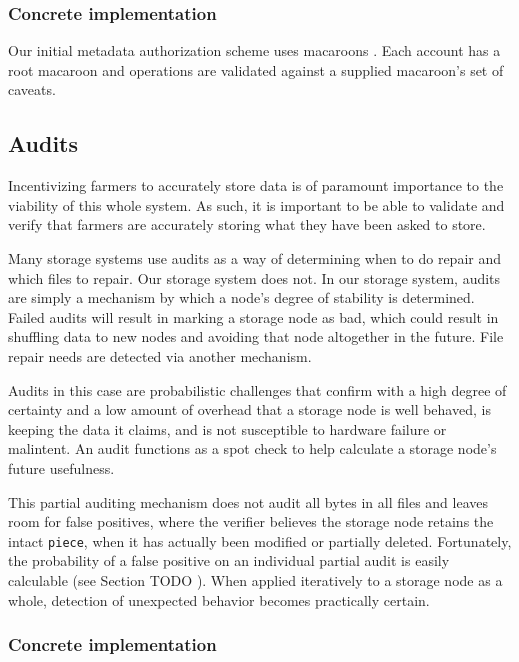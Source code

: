 \documentclass[a4paper,10pt]{article} \usepackage[utf8]{inputenc}
\newcommand{\x}[1]{{\tt #1}} \newcommand{\code}[1]{{\tt #1}}
\newcommand{\todo}[1]{{\color{red} TODO #1 }}
\begin{document}
\subsubsection{Concrete implementation}

Our initial metadata authorization scheme uses macaroons \cite{macaroons}.
Each account has a root macaroon and operations are validated against a supplied
macaroon's set of caveats.

\subsection{Audits}

Incentivizing farmers to accurately store data is of paramount importance to
the viability of this whole system. As such, it is important to be able to
validate and verify that farmers are accurately storing what they have been
asked to store.

Many storage systems use audits as a way of determining when to do repair and
which files to repair. Our storage system does not. In our storage system,
audits are simply a mechanism by which a node's degree of stability is
determined. Failed audits will result in marking a storage node as bad, which
could result in shuffling data to new nodes and avoiding that node altogether
in the future. File repair needs are detected via another mechanism.

Audits in this case are probabilistic challenges that confirm with a high
degree of certainty and a low amount of overhead that a storage node is well
behaved, is keeping the data it claims, and is not susceptible to hardware
failure or malintent. An audit functions as a spot check to help calculate a
storage node's future usefulness.

This partial auditing mechanism does not audit all bytes in all files and
leaves room for false positives, where the verifier believes the storage node
retains the intact \x{piece}, when it has actually been modified or partially
deleted. Fortunately, the probability of a false positive on an individual
partial audit is easily calculable (see Section \todo{}). When applied
iteratively to a storage node as a whole, detection of unexpected behavior
becomes practically certain.

\subsubsection{Concrete implementation}
\end{document}
